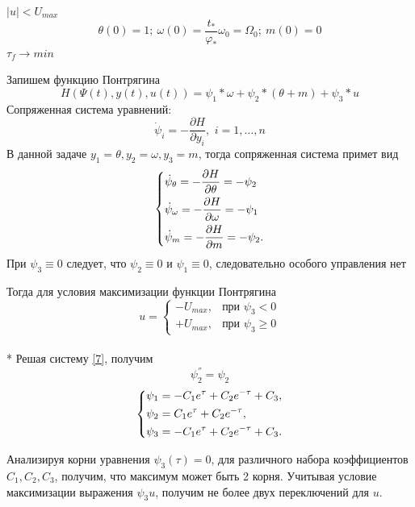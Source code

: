 \documentclass[a4paper,14pt]{article}
\theoremstyle{plain} %
\theoremstyle{definition} %
\theoremstyle{remark} %
\begin{document}
{$|u|<U_{max}$
\[
    \theta(0)=1;\ \omega(0)=\frac{t_\ast}{\varphi_\ast}\omega_0=\Omega_0;\ m(0)=0
\]
$\tau_f\to min$

Запишем функцию Понтрягина
\[
    H(\Psi(t),y(t),u(t))=\psi_1*\omega+\psi_2*(\theta+m)+\psi_3*u
\]
Сопряженная система уравнений:
\[
    \dot{\psi}_i  =  - \frac{{\partial H}}{{\partial y_i }},\,\,i = 1, \ldots ,n
\]
В данной задаче $y_1 = \theta, y_2 = \omega, y_3=m$, тогда сопряженная система примет вид
\begin{equation} \label{7}
    \left\{ {\begin{aligned}
                 & \dot \psi _\theta  =  - \frac{{\partial H}}{{\partial \theta}} = - \psi_2\hfill   \\
                 & \dot \psi _\omega   =  - \frac{{\partial H}}{{\partial \omega }} = - \psi_1\hfill \\
                 & \dot \psi _m   =  - \frac{{\partial H}}{{\partial m }} = - \psi_2 . \hfill        \\
            \end{aligned}} \right.
\end{equation}
При $\psi_3\equiv0$ следует, что $\psi_2\equiv0$ и $\psi_1\equiv0$, следовательно особого управления нет

Тогда для условия максимизации функции Понтрягина
\[
    u=
    \begin{cases}
        -U_{max}, & \text{при $\psi_3<0$}    \\
        +U_{max}, & \text{при $\psi_3\geq0$}
    \end{cases}
\]\\*
Решая систему \eqref{7}, получим
\[
    \psi^{''}_2=\psi_2
\]
\begin{equation}\label{psisystem}
    \left\{ {\begin{aligned}
                 & \psi_1 = -C_1e^\tau+C_2e^{-\tau}+C_3, \hfill  \\
                 & \psi_2 = C_1e^\tau+C_2e^{-\tau} , \hfill      \\
                 & \psi_3 = -C_1e^\tau+C_2e^{-\tau}+C_3 . \hfill \\
            \end{aligned}} \right.
\end{equation}

Анализируя корни уравнения $\psi_3(\tau)=0$, для различного набора
коэффициентов $C_1,C_2,C_3$, получим, что максимум может
быть 2 корня. Учитывая условие максимизации выражения $\psi_3u$, получим не более двух переключений для $u$.

}
\end{document}
